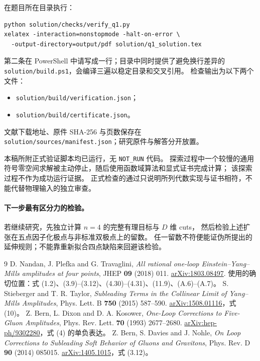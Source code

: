 \documentclass[UTF8,a4paper,11pt,fontset=fandol]{ctexart}
\begin{document}
在题目所在目录执行：
\begin{verbatim}
python solution/checks/verify_q1.py
xelatex -interaction=nonstopmode -halt-on-error \
  -output-directory=output/pdf solution/q1_solution.tex
\end{verbatim}
第二条在 PowerShell 中请写成一行；目录中同时提供了避免换行差异的
\nolinkurl{solution/build.ps1}，会编译三遍以稳定目录和交叉引用。
检查输出为以下两个文件：
\begin{itemize}
\item \nolinkurl{solution/build/verification.json}；
\item \nolinkurl{solution/build/certificate.json}。
\end{itemize}
文献下载地址、原件 SHA-256 与页数保存在
\nolinkurl{solution/sources/manifest.json}；研究原件与解答分开放置。

本稿所附正式验证脚本均已运行，无 \texttt{NOT\_RUN} 代码。
探索过程中一个较慢的通用符号零空间求解被主动停止，随后使用函数域算法和显式证书完成计算；
该探索过程不作为成功运行证据。
正式检查的通过只说明所列代数实现与证书相符，不能代替物理输入的独立审查。

\paragraph{下一步最有区分力的检验。}
若继续研究，先独立计算 $n=4$ 的完整有理目标与 $D$ 维 cuts，
然后检验上述扩张在五点因子化极点与非标准双极点上的留数。
任一留数不符便能证伪所提出的延伸规则；不能靠重新拟合四点缺陷来回避该检验。

\begin{thebibliography}{9}
D. Nandan, J. Plefka and G. Travaglini,
\emph{All rational one-loop Einstein--Yang--Mills amplitudes at four points},
JHEP \textbf{09} (2018) 011.
\href{https://arxiv.org/abs/1803.08497}{arXiv:1803.08497}.
使用的确切位置：式 (1.2)、(3.9)--(3.12)、(4.30)--(4.31)、(11.9)、(A.6)--(A.7)。
\bibitem{ST}
S. Stieberger and T. R. Taylor,
\emph{Subleading Terms in the Collinear Limit of Yang--Mills Amplitudes},
Phys. Lett. B \textbf{750} (2015) 587--590.
\href{https://arxiv.org/abs/1508.01116}{arXiv:1508.01116}，式 (10)。
\bibitem{BDK93}
Z. Bern, L. Dixon and D. A. Kosower,
\emph{One-Loop Corrections to Five-Gluon Amplitudes},
Phys. Rev. Lett. \textbf{70} (1993) 2677--2680.
\href{https://arxiv.org/abs/hep-ph/9302280}{arXiv:hep-ph/9302280}，式 (4) 的单负表达。
\bibitem{BDKsoft}
Z. Bern, S. Davies and J. Nohle,
\emph{On Loop Corrections to Subleading Soft Behavior of Gluons and Gravitons},
Phys. Rev. D \textbf{90} (2014) 085015.
\href{https://arxiv.org/abs/1405.1015}{arXiv:1405.1015}，式 (3.12)。
\end{thebibliography}
\end{document}
